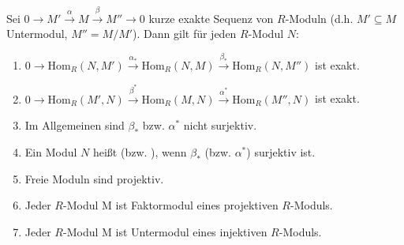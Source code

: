 \begin{PropDef}
  Sei $0 \to M' \overset{\alpha}{\to} M \overset{\beta}{\to} M'' \to 0$ kurze exakte Sequenz von $R$-Moduln (d.h.
  $M' \subseteq M$ Untermodul, $M'' = M/M'$). Dann gilt für jeden $R$-Modul $N$:
  \begin{enumerate}
    \item $0 \to \mbox{Hom}_R(N,M') \overset{\alpha_*}{\to} \mbox{Hom}_R(N,M) \overset{\beta_*}{\to}
          \mbox{Hom}_R(N,M'')$ ist exakt.
    \item $0 \to \mbox{Hom}_R(M',N) \overset{\beta^*}{\to} \mbox{Hom}_R(M,N) \overset{\alpha^*}{\to}
          \mbox{Hom}_R(M'',N)$ ist exakt.
    \item Im Allgemeinen sind $\beta_*$ bzw. $\alpha^*$ nicht surjektiv.
    \item Ein Modul $N$ heißt  (bzw.
          ), wenn $\beta_*$ (bzw.
          $\alpha^*$) surjektiv ist.
    \item Freie Moduln sind projektiv.
    \item Jeder $R$-Modul M ist Faktormodul eines projektiven $R$-Moduls.
    \item Jeder $R$-Modul M ist Untermodul eines injektiven $R$-Moduls.
  \end{enumerate}
\end{PropDef}

